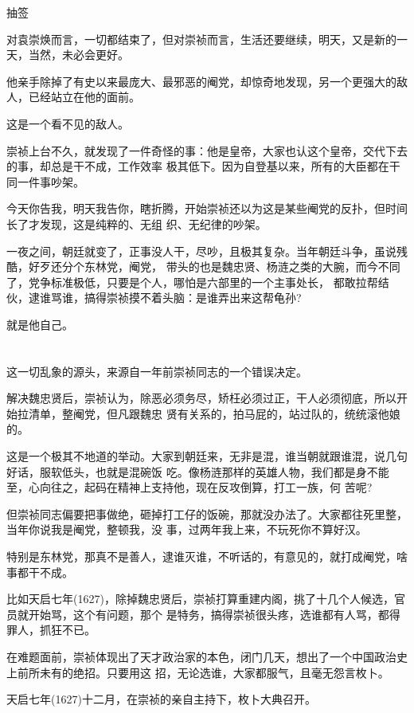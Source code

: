 \documentclass[11pt,a4paper,onecolumn]{article}
\begin{document}
抽签

对袁崇焕而言，一切都结束了，但对崇祯而言，生活还要继续，明天，又是新的一天，当然，未必会更好。

他亲手除掉了有史以来最庞大、最邪恶的阉党，却惊奇地发现，另一个更强大的敌人，已经站立在他的面前。

这是一个看不见的敌人。

崇祯上台不久，就发现了一件奇怪的事：他是皇帝，大家也认这个皇帝，交代下去的事，却总是干不成，工作效率
极其低下。因为自登基以来，所有的大臣都在干同一件事\myrule 吵架。

今天你告我，明天我告你，瞎折腾，开始崇祯还以为这是某些阉党的反扑，但时间长了才发现，这是纯粹的、无组
织、无纪律的吵架。

一夜之间，朝廷就变了，正事没人干，尽吵，且极其复杂。当年朝廷斗争，虽说残酷，好歹还分个东林党，阉党，
带头的也是魏忠贤、杨涟之类的大腕，而今不同了，党争标准极低，只要是个人，哪怕是六部里的一个主事处长，
都敢拉帮结伙，逮谁骂谁，搞得崇祯摸不着头脑：是谁弄出来这帮龟孙?

就是他自己。

\section[\thesection]{}

这一切乱象的源头，来源自一年前崇祯同志的一个错误决定。

解决魏忠贤后，崇祯认为，除恶必须务尽，矫枉必须过正，干人必须彻底，所以开始拉清单，整阉党，但凡跟魏忠
贤有关系的，拍马屁的，站过队的，统统滚他娘的。

这是一个极其不地道的举动。大家到朝廷来，无非是混，谁当朝就跟谁混，说几句好话，服软低头，也就是混碗饭
吃。像杨涟那样的英雄人物，我们都是身不能至，心向往之，起码在精神上支持他，现在反攻倒算，打工一族，何
苦呢?

但崇祯同志偏要把事做绝，砸掉打工仔的饭碗，那就没办法了。大家都往死里整，当年你说我是阉党，整顿我，没
事，过两年我上来，不玩死你不算好汉。

特别是东林党，那真不是善人，逮谁灭谁，不听话的，有意见的，就打成阉党，啥事都干不成。

比如天启七年(1627)，除掉魏忠贤后，崇祯打算重建内阁，挑了十几个人候选，官员就开始骂，这个有问题，那个
是特务，搞得崇祯很头疼，选谁都有人骂，都得罪人，抓狂不已。

在难题面前，崇祯体现出了天才政治家的本色，闭门几天，想出了一个中国政治史上前所未有的绝招。只要用这
招，无论选谁，大家都服气，且毫无怨言\myrule 枚卜。

天启七年(1627)十二月，在崇祯的亲自主持下，枚卜大典召开。
\end{document}
